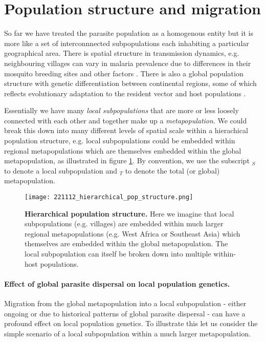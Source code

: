 \documentclass[_main.tex]{subfiles}
\begin{document}
\section*{Population structure and migration}  \label{main_pop_struc}

So far we have treated the parasite population as a homogenous entity but it is more like a set of interconnnected subpopulations each inhabiting a particular geographical area.  There is spatial structure in transmission dynamics, e.g. neighbouring villages can vary in malaria prevalence due to differences in their mosquito breeding sites and other factors \cite{Bejon2010,Omedo2017}.  There is also a global population structure with genetic differentiation between continental regions, some of which reflects evolutionary adaptation to the resident vector and host populations \cite{Manske2012,MalariaGEN2023,Band2022}.

Essentially we have many \textit{local subpopulations} that are more or less loosely connected with each other and together make up a \textit{metapopulation}.  We could break this down into many different levels of spatial scale within a hierachical population structure, e.g.  local subpopulations could be embedded within regional metapopulations which are themselves embedded within the global metapopulation, as illustrated in figure \ref{fig:main_hierarchical_1}.  By convention, we use the subscript $_S$ to denote a local subpopulation and $_T$ to denote the total (or global) metapopulation. 

\begin{figure}[h!]
\centering
\texttt{[image: 221112\_hierarchical\_pop\_structure.png]}
\caption{\textbf{Hierarchical population structure.}  Here we imagine that local subpopulations (e.g. villages) are embedded within much larger regional metapopulations (e.g. West Africa or Southeast Asia) which themselves are embedded within the global metapopulation.  The local subpopulation can itself be broken down into multiple within-host populations.}
\label{fig:main_hierarchical_1}
\end{figure}

\paragraph{Effect of global parasite dispersal on local population genetics.} Migration from the global metapopulation into a local subpopulation - either ongoing or due to historical patterns of global parasite dispersal - can have a profound effect on local population genetics.  To illustrate this let us consider the simple scenario of a local subpopulation within a much larger metapopulation.  
\end{document}
